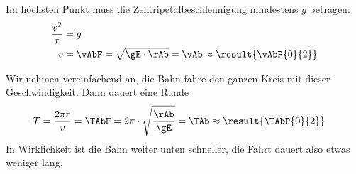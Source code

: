 \begin{abcliste}
\abc Im höchsten Punkt muss die Zentripetalbeschleunigung mindestens $g$ betragen:
\begin{align}
 \frac{v^2}{r} &= g \\
 v &= \vAbF = \sqrt{\gE\cdot\rAb} = \vAb \approx \result{\vAbP{0}{2}}
\end{align}

\abc Wir nehmen vereinfachend an, die Bahn fahre den ganzen Kreis mit dieser Geschwindigkeit. Dann dauert eine Runde
\begin{align}
 T &= \frac{2\pi r}{v} = \TAbF = 2\pi\cdot\sqrt{\frac{\rAb}{\gE}} = \TAb \approx \result{\TAbP{0}{2}}
\end{align}
In Wirklichkeit ist die Bahn weiter unten schneller, die Fahrt dauert also etwas weniger lang.
\end{abcliste}
